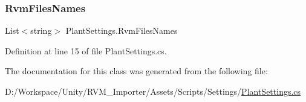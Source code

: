 \mbox{\label{class_plant_settings_a0585d33a62c175024d74037aa4de491b}} 
\subsubsection{\texorpdfstring{RvmFilesNames}{RvmFilesNames}}
{\footnotesize\ttfamily List$<$string$>$ Plant\+Settings.\+Rvm\+Files\+Names}



Definition at line 15 of file Plant\+Settings.\+cs.



The documentation for this class was generated from the following file\+:\begin{DoxyCompactItemize}
\item 
D\+:/\+Workspace/\+Unity/\+R\+V\+M\+\_\+\+Importer/\+Assets/\+Scripts/\+Settings/\mbox{\hyperlink{_plant_settings_8cs}{Plant\+Settings.\+cs}}\end{DoxyCompactItemize}

